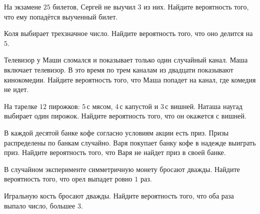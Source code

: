 \begin{class}[number=1]
\begin{listofex}
		\item На экзамене \( 25 \) билетов, Сергей не выучил \( 3 \) из них. Найдите вероятность того, что ему попадётся выученный билет.
		\item Коля выбирает трехзначное число. Найдите вероятность того, что оно делится на \( 5 \).
		\item Телевизор у Маши сломался и показывает только один случайный канал. Маша включает телевизор. В это время по трем каналам из двадцати показывают кинокомедии. Найдите вероятность того, что Маша попадет на канал, где комедия не идет.
		\item На тарелке \( 12 \) пирожков: \( 5 \) с мясом, \( 4 \) с капустой и \( 3 \) с вишней. Наташа наугад выбирает один пирожок. Найдите вероятность того, что он окажется с вишней.
		\item В каждой десятой банке кофе согласно условиям акции есть приз. Призы распределены по банкам случайно. Варя покупает банку кофе в надежде выиграть приз. Найдите вероятность того, что Варя не найдет приз в своей банке.
		\item В случайном эксперименте симметричную монету бросают дважды. Найдите вероятность того, что орел выпадет ровно \( 1 \) раз.
		\item Игральную кость бросают дважды. Найдите вероятность того, что оба раза выпало число, большее \( 3 \).
		
	\end{listofex}
\end{class}


